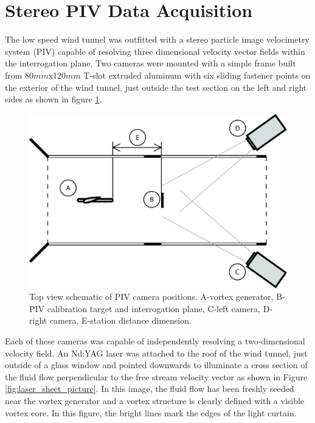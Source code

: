 

\section{Stereo PIV Data Acquisition}

The low speed wind tunnel was outfitted with a stereo particle image 
velocimetry system (PIV) capable of resolving three dimensional velocity vector 
fields within the interrogation plane. Two cameras were mounted with a simple 
frame built from 80$mm$x120$mm$ T-slot extruded aluminum with six sliding 
fastener points on the exterior of the wind tunnel, just outside the test 
section on the left and right sides as shown in figure \ref{fig:pivsetup}. 

\begin{figure}[H]
	\centering
	\includegraphics[width=5in]{figs/piv_method/piv_camera_diagram}
	\caption{Top view schematic of PIV camera positions. A-vortex generator, 
	B-PIV 
		calibration target and interrogation plane, C-left camera, D-right 
		camera, E-station distance dimension.}
	\label{fig:pivsetup}
\end{figure}

Each of these cameras was capable of independently resolving a two-dimensional 
velocity field. An Nd:YAG laser was attached to the roof of the wind tunnel, 
just outside of a glass window and pointed downwards to illuminate a cross 
section of the fluid flow perpendicular to the free stream velocity vector as 
shown in Figure \ref{fig:laser_sheet_picture}. In this image, the fluid flow 
has been freshly seeded near the vortex generator and a vortex structure is 
clearly defined with a visible vortex core. In this figure, the bright lines 
mark the edges of the light curtain.


